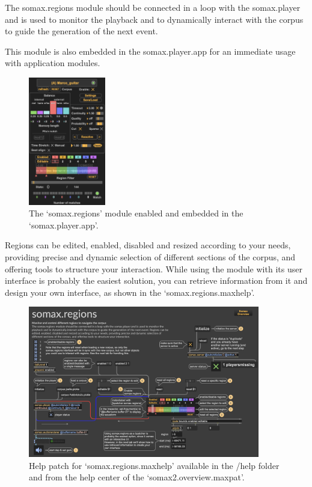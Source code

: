 The somax.regions module should be connected in a loop with the somax.player and is used to monitor the playback and to dynamically interact with the corpus to guide the generation of the next event. 

This module is also embedded in the somax.player.app for an immediate usage with application modules.



\begin{figure}[H]
    \centering        
 	\includegraphics[width=0.3\textwidth, trim=0 0 0 5, clip, keepaspectratio]{img/player_compact_regions.png}
    \caption{The `somax.regions' module enabled and embedded in the `somax.player.app'.}
    \label{fig:player_regions}
\end{figure}

Regions can be edited, enabled, disabled and resized according to your needs, providing precise and dynamic selection of different sections of the corpus, and offering tools to structure your interaction. 
While using the module with its user interface is probably the easiest solution, you can retrieve information from it and design your own interface, as shown in the `somax.regions.maxhelp'.

\begin{figure}[H]
    \centering        
 	\includegraphics[width=0.9\textwidth, keepaspectratio]{img/regions_help.png}
    \caption{Help patch for `somax.regions.maxhelp' available in the /help folder and from the help center of the `somax2.overview.maxpat'.}
    \label{fig:regions_help}
\end{figure}



